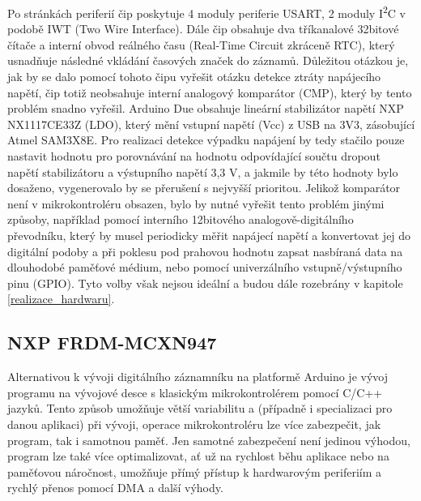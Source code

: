 Po stránkách periferií čip poskytuje 4 moduly periferie USART, 2 moduly I\textsuperscript{2}C v podobě IWT (Two Wire Interface). Dále čip obsahuje dva tříkanalové 32bitové čítače a interní obvod reálného času (Real-Time Circuit zkráceně RTC), který usnadňuje následné vkládání časových značek do záznamů. Důležitou otázkou je, jak by se dalo pomocí tohoto čipu vyřešit otázku detekce ztráty napájecího napětí, čip totiž neobsahuje interní analogový komparátor (CMP), který by tento problém snadno vyřešil. Arduino Due obsahuje lineární stabilizátor napětí NXP NX1117CE33Z (LDO), který mění vstupní napětí (Vcc) z USB na 3V3, zásobující Atmel SAM3X8E. Pro realizaci detekce výpadku napájení by tedy stačilo pouze nastavit hodnotu pro porovnávání na hodnotu odpovídající součtu dropout napětí stabilizátoru a výstupního napětí 3,3 V, a jakmile by této hodnoty bylo dosaženo, vygenerovalo by se přerušení s nejvyšší prioritou. Jelikož komparátor není v mikrokontroléru obsazen, bylo by nutné vyřešit tento problém jinými způsoby, například pomocí interního 12bitového analogově-digitálního převodníku, který by musel periodicky měřit napájecí napětí a konvertovat jej do digitální podoby a při poklesu pod prahovou hodnotu zapsat nasbíraná data na dlouhodobé paměťové médium, nebo pomocí univerzálního vstupně/výstupního pinu (GPIO). Tyto volby však nejsou ideální a budou dále rozebrány v kapitole \ref{realizace_hardwaru}. \cite{arduino_shop_due, nxp_NX1117C_ldo}


\subsection{NXP FRDM-MCXN947}
\label{nxp_frdm_mcxn947}
Alternativou k vývoji digitálního záznamníku na platformě Arduino je vývoj programu na vývojové desce s klasickým mikrokontrolérem pomocí C/C++ jazyků. Tento způsob umožňuje větší variabilitu a (případně i specializaci pro danou aplikaci) při vývoji, operace mikrokontroléru lze více zabezpečit, jak program, tak i samotnou paměť. Jen samotné zabezpečení není jedinou výhodou, program lze také více optimalizovat, ať už na rychlost běhu aplikace nebo na paměťovou náročnost, umožňuje přímý přístup k hardwarovým periferiím a rychlý přenos pomocí DMA a další výhody.

